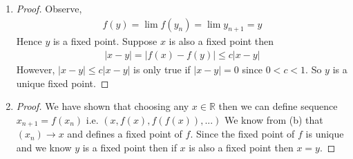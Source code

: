\begin{enumerate}[label=(\alph*)]
    \item
    \begin{proof}
        Observe,
        \begin{align*}
            f(y) = \lim f(y_n) = \lim y_{n+1} = y
        \end{align*}
        Hence $y$ is a fixed point. Suppose $x$ is also a fixed point then 
        \begin{align*}
            |x-y| = |f(x)-f(y)| \leq c|x-y|
        \end{align*}
        However, $|x-y| \leq c |x-y|$ is only true if $|x-y|=0$ since $0<c<1$.
        So $y$ is a unique fixed point.
    \end{proof}

    \item
    \begin{proof}
        We have shown that choosing any $x\in \mathbb{R}$ then 
        we can define sequence $x_{n+1}=f(x_n)$ i.e. $(x, f(x), f(f(x)), ...)$
        We know from (b) that $(x_n)\rightarrow x$ and defines a fixed point 
        of $f$. Since the fixed point of $f$ is unique and 
        we know $y$ is a fixed point then if $x$ is
        also a fixed point then $x=y$.
    \end{proof}
\end{enumerate}

